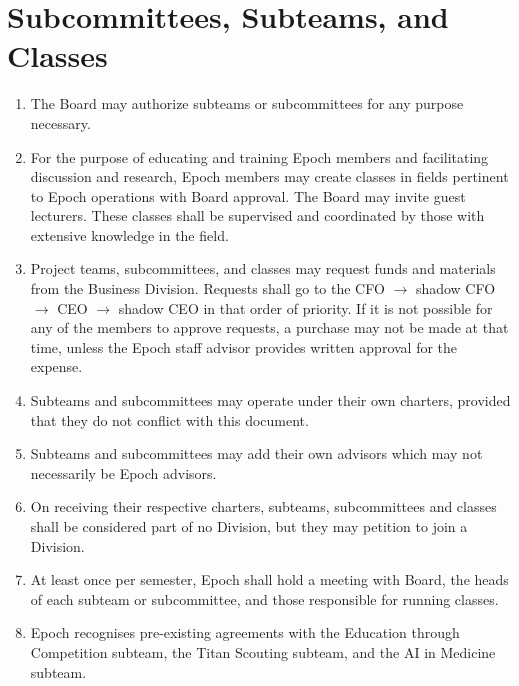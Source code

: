 \documentclass{article}
\begin{document}
\section{Subcommittees, Subteams, and Classes}
\begin{enumerate}
    \item The Board may authorize subteams or subcommittees for any purpose necessary.
    \item For the purpose of educating and training Epoch members and facilitating discussion and research, Epoch members may create classes in fields pertinent to Epoch operations with Board approval. The Board may invite guest lecturers. These classes shall be supervised and coordinated by those with extensive knowledge in the field.
    \item Project teams, subcommittees, and classes may request funds and materials from the Business Division. Requests shall go to the CFO $\rightarrow$ shadow CFO $\rightarrow$ CEO $\rightarrow$ shadow CEO in that order of priority. If it is not possible for any of the members to approve requests, a purchase may not be made at that time, unless the Epoch staff advisor provides written approval for the expense.
    \item Subteams and subcommittees may operate under their own charters, provided that they do not conflict with this document.
    \item Subteams and subcommittees may add their own advisors which may not necessarily be Epoch advisors.
    \item On receiving their respective charters, subteams, subcommittees and classes shall be considered part of no Division, but they may petition to join a Division.
    \item At least once per semester, Epoch shall hold a meeting with Board, the heads of each subteam or subcommittee, and those responsible for running classes.
    \item Epoch recognises pre-existing agreements with the Education through Competition subteam, the Titan Scouting subteam, and the AI in Medicine subteam.
\end{enumerate}
\end{document}
